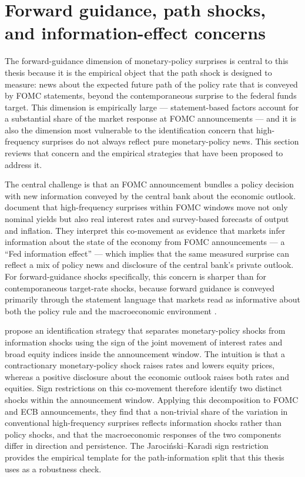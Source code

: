 \section{Forward guidance, path shocks, and information-effect concerns}
\label{sec:literature-forward-guidance}

The forward-guidance dimension of monetary-policy surprises is central
to this thesis because it is the empirical object that the path shock
\citep{swanson2021} is designed to measure: news about the expected
future path of the policy rate that is conveyed by FOMC statements,
beyond the contemporaneous surprise to the federal funds target. This
dimension is empirically large --- statement-based factors account for
a substantial share of the market response at FOMC announcements
\citep{gurkaynakSackSwanson2005,swanson2021} --- and it is also the
dimension most vulnerable to the identification concern that high-frequency
surprises do not always reflect pure monetary-policy news. This section
reviews that concern and the empirical strategies that have been proposed
to address it.

The central challenge is that an FOMC announcement bundles a policy
decision with new information conveyed by the central bank about the
economic outlook. \citet{nakamuraSteinsson2018} document that
high-frequency surprises within FOMC windows move not only nominal
yields but also real interest rates and survey-based forecasts of
output and inflation. They interpret this co-movement as evidence that
markets infer information about the state of the economy from FOMC
announcements --- a ``Fed information effect'' --- which implies that
the same measured surprise can reflect a mix of policy news and
disclosure of the central bank's private outlook. For forward-guidance
shocks specifically, this concern is sharper than for contemporaneous
target-rate shocks, because forward guidance is conveyed primarily
through the statement language that markets read as informative about
both the policy rule and the macroeconomic environment
\citep{cieslakSchrimpf2019,hansenMcMahonTong2019}.

\citet{jarocinskiKaradi2020} propose an identification strategy that
separates monetary-policy shocks from information shocks using the
sign of the joint movement of interest rates and broad equity indices
inside the announcement window. The intuition is that a contractionary
monetary-policy shock raises rates and lowers equity prices, whereas a
positive disclosure about the economic outlook raises both rates and
equities. Sign restrictions on this co-movement therefore identify
two distinct shocks within the announcement window. Applying this
decomposition to FOMC and ECB announcements, they find that a
non-trivial share of the variation in conventional high-frequency
surprises reflects information shocks rather than policy shocks, and
that the macroeconomic responses of the two components differ in
direction and persistence. The Jarociński--Karadi sign restriction
provides the empirical template for the path-information split that
this thesis uses as a robustness check.

